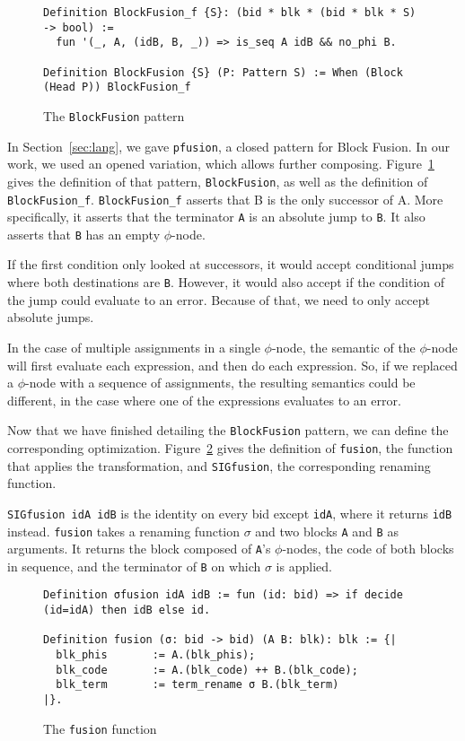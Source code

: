 \documentclass[11pt]{article}
\newcommand{\inlinecoq}[1]{\mbox{\lstinline[style=customcoq,columns=fixed,basewidth=.48em]{#1}}}
\newcommand{\ilc}[1]{\inlinecoq{#1}}
\begin{document}
\begin{figure}[h]
  \begin{lstlisting}[style=customcoq,basicstyle=\small\ttfamily]
Definition BlockFusion_f {S}: (bid * blk * (bid * blk * S) -> bool) :=
  fun '(_, A, (idB, B, _)) => is_seq A idB && no_phi B.

Definition BlockFusion {S} (P: Pattern S) := When (Block (Head P)) BlockFusion_f
  \end{lstlisting}
  \caption{The \ilc{BlockFusion} pattern}
  \label{fig:bfusion}
\end{figure}

In Section~\ref{sec:lang}, we gave \ilc{pfusion}, a closed pattern for Block Fusion. In our work, we used an opened variation, which allows further composing. Figure~\ref{fig:bfusion} gives the definition of that pattern, \ilc{BlockFusion}, as well as the definition of \ilc{BlockFusion_f}.
%
\ilc{BlockFusion_f} asserts that B is the only successor of A. More specifically, it asserts that the terminator \ilc{A} is an absolute jump to \ilc{B}. It also asserts that \ilc{B} has an empty $\phi$-node.

If the first condition only looked at successors, it would accept conditional jumps where both destinations are \ilc{B}. However, it would also accept if the condition of the jump could evaluate to an error. Because of that, we need to only accept absolute jumps.

In the case of multiple assignments in a single $\phi$-node, the semantic of the $\phi$-node will first evaluate each expression, and then do each expression. So, if we replaced a $\phi$-node with a sequence of assignments, the resulting semantics could be different, in the case where one of the expressions evaluates to an error.

Now that we have finished detailing the \ilc{BlockFusion} pattern, we can define the corresponding optimization. Figure~\ref{fig:fusion} gives the definition of \ilc{fusion}, the function that applies the transformation, and \ilc{SIGfusion}, the corresponding renaming function.

\ilc{SIGfusion idA idB} is the identity on every bid except \ilc{idA}, where it returns \ilc{idB} instead. \ilc{fusion} takes a renaming function $\sigma$ and two blocks \ilc{A} and \ilc{B} as arguments. It returns the block composed of \ilc{A}'s $\phi$-nodes, the code of both blocks in sequence, and the terminator of \ilc{B} on which $\sigma$ is applied.

\begin{figure}
  \begin{lstlisting}[style=customcoq,basicstyle=\small\ttfamily]
Definition σfusion idA idB := fun (id: bid) => if decide (id=idA) then idB else id.

Definition fusion (σ: bid -> bid) (A B: blk): blk := {|
  blk_phis       := A.(blk_phis);
  blk_code       := A.(blk_code) ++ B.(blk_code);
  blk_term       := term_rename σ B.(blk_term)
|}.
  \end{lstlisting}
  \caption{The \ilc{fusion} function}
  \label{fig:fusion}
\end{figure}
\end{document}
